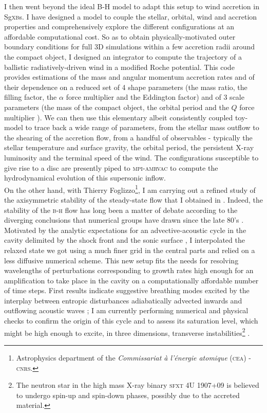 \documentclass[a4paper,12pt,onecolumn]{article}
\begin{document}
\indent I then went beyond the ideal B-H model to adapt this setup to wind accretion in Sg\textsc{xb}s. I have designed a model to couple the stellar, orbital, wind and accretion properties and comprehensively explore the different configurations at an affordable computational cost.  So as to obtain physically-motivated outer boundary conditions for full 3D simulations within a few accretion radii around the compact object, I designed an integrator to compute the trajectory of a ballistic radiatively-driven wind \citep{Castor1975} in a modified Roche potential. This code provides estimations of the mass and angular momentum accretion rates and of their dependence on a reduced set of 4 shape parameters (the mass ratio, the filling factor, the $\alpha$ force multiplier and the Eddington factor) and of 3 scale parameters (the mass of the compact object, the orbital period and the $Q$ force multiplier \cite{Gayley1995}). We can then use this elementary albeit consistently coupled toy-model to trace back a wide range of parameters, from the stellar mass outflow to the shearing of the accretion flow, from a handful of observables - typically the stellar temperature and surface gravity, the orbital period, the persistent X-ray luminosity and the terminal speed of the wind. The configurations susceptible to give rise to a disc are presently piped to \textsc{mpi-amrvac} to compute the hydrodynamical evolution of this supersonic inflow.\\

\indent On the other hand, with Thierry Foglizzo\footnote{Astrophysics department of the \textit{Commissariat \`a l'\'energie atomique} (\textsc{cea}) - \textsc{cnrs}.}, I am carrying out a refined study of the axisymmetric stability of the steady-state flow that I obtained in \cite{ElMellah2015}. Indeed, the stability of the \textsc{b-h} flow has long been a matter of debate according to the diverging conclusions that numerical groups have drawn since the late 80's \cite{Foglizzo2005}. Motivated by the analytic expectations for an advective-acoustic cycle in the cavity delimited by the shock front and the sonic surface \citep{Foglizzo2009}, I interpolated the relaxed state we got using a much finer grid in the central parts and relied on a less diffusive numerical scheme. This new setup fits the needs for resolving wavelengths of perturbations corresponding to growth rates high enough for an amplification to take place in the cavity on a computationally affordable number of time steps. First results indicate suggestive breathing modes excited by the interplay between entropic disturbances adiabatically advected inwards and outflowing acoustic waves ; I am currently performing numerical and physical checks to confirm the origin of this cycle and to assess its saturation level, which might be high enough to excite, in three dimensions, transverse instabilities\footnote{The neutron star in the high mass X-ray binary \textsc{sfxt} 4U 1907+09 is believed to undergo spin-up and spin-down phases, possibly due to the accreted material.} \cite{Blondin:2012vf}.\\
\end{document}
